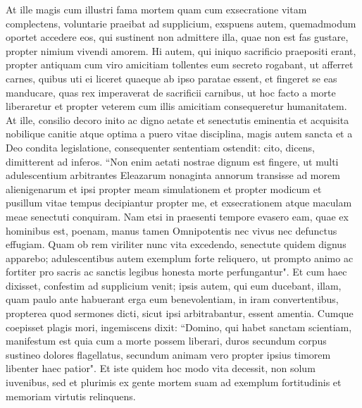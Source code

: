 \begin{biblechapter}
\verse At ille magis cum illustri fama mortem quam cum exsecratione vitam complectens, voluntarie praeibat ad supplicium, 
\verse exspuens autem, quemadmodum oportet accedere eos, qui sustinent non admittere illa, quae non est fas gustare, propter nimium vivendi amorem. 
\verse Hi autem, qui iniquo sacrificio praepositi erant, propter antiquam cum viro amicitiam tollentes eum secreto rogabant, ut afferret carnes, quibus uti ei liceret quaeque ab ipso paratae essent, et fingeret se eas manducare, quas rex imperaverat de sacrificii carnibus, 
\verse ut hoc facto a morte liberaretur et propter veterem cum illis amicitiam consequeretur humanitatem. 
\verse At ille, consilio decoro inito ac digno aetate et senectutis eminentia et acquisita nobilique canitie atque optima a puero vitae disciplina, magis autem sancta et a Deo condita legislatione, consequenter sententiam ostendit: cito, dicens, dimitterent ad inferos. 
\verse “Non enim aetati nostrae dignum est fingere, ut multi adulescentium arbitrantes Eleazarum nonaginta annorum transisse ad morem alienigenarum 
\verse et ipsi propter meam simulationem et propter modicum et pusillum vitae tempus decipiantur propter me, et exsecrationem atque maculam meae senectuti conquiram.  
\verse Nam etsi in praesenti tempore evasero eam, quae ex hominibus est, poenam, manus tamen Omnipotentis nec vivus nec defunctus effugiam. 
\verse Quam ob rem viriliter nunc vita excedendo, senectute quidem dignus apparebo; 
\verse adulescentibus autem exemplum forte reliquero, ut prompto animo ac fortiter pro sacris ac sanctis legibus honesta morte perfungantur". Et cum haec dixisset, confestim ad supplicium venit; 
\verse ipsis autem, qui eum ducebant, illam, quam paulo ante habuerant erga eum benevolentiam, in iram convertentibus, propterea quod sermones dicti, sicut ipsi arbitrabantur, essent amentia. 
\verse Cumque coepisset plagis mori, ingemiscens dixit: “Domino, qui habet sanctam scientiam, manifestum est quia cum a morte possem liberari, duros secundum corpus sustineo dolores flagellatus, secundum animam vero propter ipsius timorem libenter haec patior". 
\verse Et iste quidem hoc modo vita decessit, non solum iuvenibus, sed et plurimis ex gente mortem suam ad exemplum fortitudinis et memoriam virtutis relinquens. 
\end{biblechapter}


